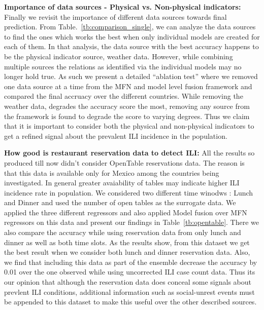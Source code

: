 {\noindent \textbf{Importance of data sources - Physical vs. Non-physical indicators: }} Finally we revisit the importance of different data sources
towards final prediction. From Table.~\ref{tb:comparison_single}, we can analyze the data sources
to find the ones which works the best when only individual models are created for each of them. 
In that analysis, the data source with the best accuracy happens to be the physical indicator source, 
weather data. However, while combining multiple sources the relations as identified via the individual models
may no longer hold true. As such we present a detailed ``ablation test'' where we removed one data source at a time
from the MFN and model level fusion framework and compared the final accruacy over the different countries. 
While removing the weather data, degrades the accuracy score the most, removing any source from the framework is found
to degrade the score to varying degrees. Thus we claim that it is important to consider both the physical 
and non-physical indicators to get a refined signal about the prevalent ILI incidence in the population.




{\noindent \textbf{How good is restaurant reservation data to detect ILI: }} All the results so produced till now
didn't consider OpenTable reservations data. The reason is that this data is available only for Mexico among the 
countries being investigated. In general greater avaiability of tables may indicate higher ILI incidence rate in population.
We considered two different time winodws : Lunch and Dinner and used the number of open tables as the surrogate data.
We applied the three different regressors and also applied Model fusion over MFN regressors on this data and present 
our findings in Table~\ref{tb:opentable}. There we also compare the accuracy while using reservation 
data from only lunch and dinner as well as both time slots. As the results show, from this dataset we get the best 
result when we consider both lunch and dinner reservation data. Also, we find that including this data as part of the
ensemble decrease the accuracy by 0.01 over the one observed while using uncorrected ILI case count data. Thus its 
our opinion that although the reservation data does conceal some signals about prevlent ILI conditions, additional
information such as social-unrest events must be appended to this dataset to make this useful over the 
other described sources.


